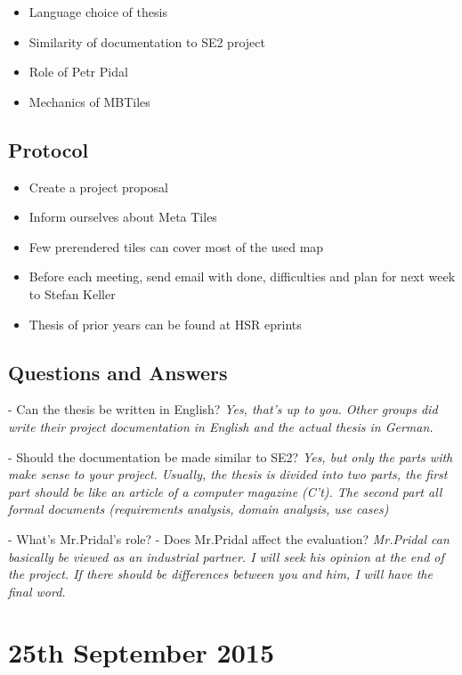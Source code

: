 \begin{itemize}
  \item Language choice of thesis
  \item Similarity of documentation to SE2 project
  \item Role of Petr Pidal
  \item Mechanics of MBTiles
\end{itemize}

\subsection*{Protocol}
\begin{itemize}
  \item Create a project proposal
  \item Inform ourselves about Meta Tiles
  \item Few prerendered tiles can cover most of the used map
  \item Before each meeting, send email with done, difficulties and plan for next week to Stefan Keller
  \item Thesis of prior years can be found at HSR eprints
\end{itemize}


\subsection*{Questions and Answers}

- Can the thesis be written in English?
\textit{Yes, that's up to you. Other groups did write their project documentation in English and the actual thesis in German.}

- Should the documentation be made similar to SE2?
\textit{Yes, but only the parts with make sense to your project. Usually, the thesis is divided into two parts, the first part should be like an article of a computer magazine (C't). The second part all formal documents (requirements analysis, domain analysis, use cases)}

- What's Mr.Pridal's role? - Does Mr.Pridal affect the evaluation?
\textit{Mr.Pridal can basically be viewed as an industrial partner. I will seek his opinion at the end of the project. If there should be differences between you and him, I will have the final word.}

\section*{25th September 2015}

